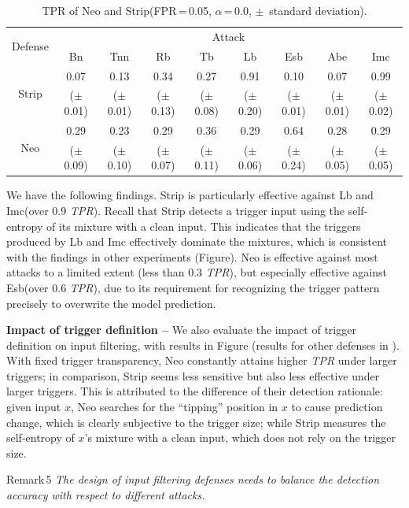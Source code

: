 \documentclass[compsoc,conference,a4paper,10pt,times]{IEEEtran}
\newcommand{\bn}{{\sc Bn}\xspace}
\newcommand{\tnn}{{\sc Tnn}\xspace}
\newcommand{\tb}{{\sc Tb}\xspace}
\newcommand{\lb}{{\sc Lb}\xspace}
\newcommand{\esb}{{\sc Esb}\xspace}
\newcommand{\rfb}{{\sc Rb}\xspace}
\newcommand{\abe}{{\sc Abe}\xspace}
\newcommand{\imc}{{\sc Imc}\xspace}
\newcommand{\tpr}{{\em \small TPR}\xspace}
\newcommand{\strip}{{\sc Strip}\xspace}
\newcommand{\neo}{{\sc Neo}\xspace}
\begin{document}
\begin{table}[!ht]{\footnotesize
    \centering
    \renewcommand{\arraystretch}{1.2}
 \setlength{\tabcolsep}{0.3pt}
    \begin{tabular}{c|c|c|c|c|c|c|c|c}
        \multirow{2}{*}{Defense} & \multicolumn{8}{c}{Attack} \\
        \cline{2-9}
    & \bn & \tnn & \rfb & \tb & \lb & \esb & \abe & \imc  \\
    \hline
    \hline
   \multirow{2}{*}{\strip} & 0.07 & 0.13 & 0.34 & 0.27 & \cellcolor{Red}0.91 & 0.10 & 0.07 & \cellcolor{Red}0.99 \\
        & ($\pm$0.01) & ($\pm$0.01) & ($\pm$0.13) & ($\pm$0.08) & ($\pm$0.20) & ($\pm$0.01) & ($\pm$0.01) & ($\pm$0.02)\\
    \hline
  \multirow{2}{*}{\neo} & 0.29 & 0.23 & 0.29 & 0.36 & 0.29 & \cellcolor{Red}0.64 & 0.28 & 0.29 \\
        & ($\pm$0.09) & ($\pm$0.10) & ($\pm$0.07) & ($\pm$0.11) & ($\pm$0.06) & ($\pm$0.24) & ($\pm$0.05) & ($\pm$0.05)\\
    \end{tabular}
    \caption{TPR of \neo and \strip (FPR\,=\,0.05, $\alpha$\,=\,0.0, $\pm$\, standard deviation). \label{tab:input-filtering}}}
\end{table}


We have the following findings.  \strip is particularly effective against \lb and \imc (over 0.9 \tpr). Recall that \strip detects a trigger input using the self-entropy of its mixture with a clean input. This indicates that the triggers produced by \lb and \imc effectively dominate the mixtures, which is consistent with the findings in other experiments (\mcf Figure).  \neo is effective against most attacks to a limited extent (less than 0.3 \tpr), but especially effective against \esb (over 0.6 \tpr), due to its requirement for recognizing the trigger pattern precisely to overwrite the model prediction.  

\vspace{2pt}
{\bf Impact of trigger definition --} We also evaluate the impact of trigger definition on input filtering, with results in Figure (results for other defenses in ). With fixed trigger transparency, \neo constantly attains higher \tpr under larger triggers; in comparison, \strip seems less sensitive but also less effective under larger triggers. This is attributed to the difference of their detection rationale: given input $x$, \neo searches for the ``tipping'' position in $x$ to cause prediction change, which is clearly subjective to the trigger size; while \strip measures the self-entropy of $x$'s mixture with a clean input, which does not rely on the trigger size. 
\begin{mtbox}{\small Remark\,5}
{\em \small The design of input filtering defenses needs to balance the detection accuracy with respect to different attacks.}
\end{mtbox}
\end{document}
